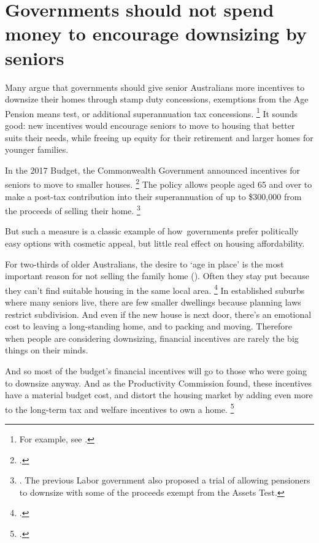 \section{Governments should not spend money to encourage downsizing by seniors}\label{sec:governments-should-not-spend-money-to-encourage-downsizing-by-seniors}

Many argue that governments should give senior Australians more incentives to downsize their homes through stamp duty concessions, exemptions from the Age Pension means test, or additional superannuation tax concessions.%
	\footnote{For example, see \textcites{Property-Council-2015-Rethink-sub-Unlocking-home-equity}{Ong-etal-2016-theConvo-lack-housing-choice-frustrates-downsizer}.}
It sounds good: new incentives would encourage seniors to move to housing that better suits their needs, while freeing up equity for their retirement and larger homes for younger families.

In the 2017 Budget, the Commonwealth Government announced incentives for seniors to move to smaller houses.%
	\footcite{Budget1718-Reducing-barriers-to-downsizing}
The policy allows people aged 65 and over to make a post-tax contribution into their superannuation of up to \$300,000 from the proceeds of selling their home.%
    \footnote{\textcite{ATO2017_downsizing_contributions}. The previous Labor government also proposed a trial of allowing pensioners to downsize with some of the proceeds exempt from the Assets Test.}

But such a measure is a classic example of how~governments prefer politically easy options with cosmetic appeal, but little real effect on housing affordability.

For two-thirds of older Australians, the desire to `age in place' is the most important reason for not selling the family home ().
Often they stay put because they can't find suitable housing in the same local area.%
    \footcite{DaleyCoates-2017-theConvo-Why-old-Aust-wont-downsize}
In established suburbs where many seniors live, there are few smaller dwellings because planning laws restrict subdivision.
And even if the new house is next door, there's an emotional cost to leaving a long-standing home, and to packing and moving.
Therefore when people are considering downsizing, financial incentives are rarely the big things on their minds.

And so most of the budget's financial incentives will go to those who were going to downsize anyway.
And as the Productivity Commission found, these incentives have a material budget cost, and distort the housing market by adding even more to the long-term tax and welfare incentives to own a home.%
    \footcite{PC-2015-Housing-decisions-elderly}

